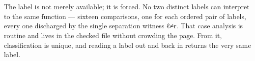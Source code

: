\documentclass[11pt,a4paper]{book}
\def\texttt#1{#1}%
\begin{document}
\begin{code}[hide]
\AgdaSymbol{\AgdaUnderscore{}}%
\>[19]\AgdaSymbol{|}\AgdaSpace{}%
\AgdaSpace{}%
\AgdaSpace{}%
\AgdaSymbol{=}\AgdaSpace{}%
\AgdaSpace{}%
\<%
\\
%
\>[2]\AgdaSpace{}%
\AgdaSymbol{|}\AgdaSpace{}%
\AgdaSpace{}%
\AgdaSymbol{\AgdaUnderscore{}}%
\>[19]\AgdaSymbol{|}\AgdaSpace{}%
\AgdaSpace{}%
\AgdaSpace{}%
\AgdaSymbol{=}\AgdaSpace{}%
\AgdaSpace{}%
\AgdaSpace{}%
\AgdaSymbol{(}\AgdaSpace{}%
\AgdaSymbol{)}\<%
\end{code}

\begin{code}%
%
\>[2]\AgdaSpace{}%
\AgdaSymbol{:}\AgdaSpace{}%
\AgdaSymbol{(}\AgdaSpace{}%
\AgdaSymbol{:}\AgdaSpace{}%
\AgdaSymbol{)}\AgdaSpace{}%
\AgdaSpace{}%
\AgdaSpace{}%
\AgdaSymbol{(}\AgdaSpace{}%
\AgdaSymbol{)}\AgdaSpace{}%
\AgdaSpace{}%
\<%
\\
%
\>[2]\AgdaSpace{}%
\AgdaSpace{}%
\AgdaSpace{}%
\AgdaSymbol{=}\AgdaSpace{}%
\AgdaSpace{}%
\AgdaSpace{}%
\AgdaSymbol{(}\AgdaSpace{}%
\AgdaSymbol{)}\AgdaSpace{}%
\AgdaSymbol{(}\AgdaSpace{}%
\AgdaSymbol{)}\AgdaSpace{}%
\<%
\end{code}

The label is not merely available; it is forced. No two distinct labels
can interpret to the same function --- sixteen comparisons, one for each
ordered pair of labels, every one discharged by the single separation
witness \texttt{ℓ≠r}. That case analysis is routine and lives in the
checked file without crowding the page. From it, classification is
unique, and reading a label out and back in returns the very same label.
\end{document}
